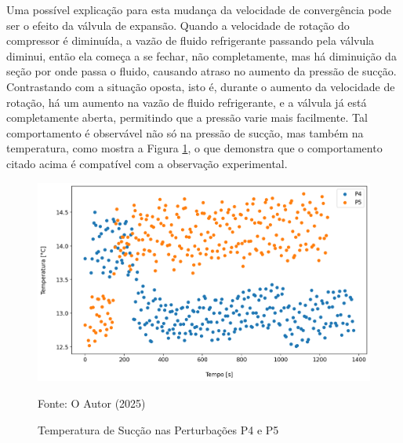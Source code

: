 Uma possível explicação para esta mudança da velocidade de convergência pode ser o efeito da válvula de expansão. Quando a velocidade de rotação do compressor é diminuída, a vazão de fluido refrigerante passando pela válvula diminui, então ela começa a se fechar, não completamente, mas há diminuição da seção por onde passa o fluido, causando atraso no aumento da pressão de sucção. Contrastando com a situação oposta, isto é, durante o aumento da velocidade de rotação, há um aumento na vazão de fluido refrigerante, e a válvula já está completamente aberta, permitindo que a pressão varie mais facilmente. Tal comportamento é observável não só na pressão de sucção, mas também na temperatura, como mostra a Figura \ref{fig:TempSucçãoSubidaeDescida}, o que demonstra que o comportamento citado acima é compatível com a observação experimental.
\newpage
\begin{figure}[h]
    \centering
    \includegraphics[width=1\linewidth]{FigurasdoTexto/Temperatura de Sucção.png}
    \caption{Temperatura de Sucção  nas Perturbações P4 e P5}
    \label{fig:TempSucçãoSubidaeDescida}
    {\footnotesize Fonte: O Autor (2025)}
\end{figure}

